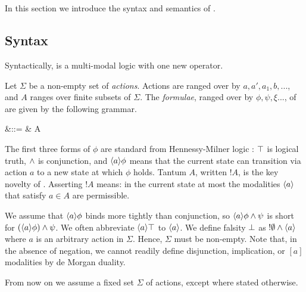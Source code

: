 \section{\Cathoristic{}}\label{coreEL}

In this section we introduce the syntax and semantics of \cathoristic{}.

\subsection{Syntax}
\label{elsyntax}
\NI Syntactically, \cathoristic{} is a multi-modal logic with one new
operator.

\begin{definition} Let $\Sigma$ be a non-empty set of \emph{actions}.
Actions are ranged over by $a, a', a_1, b, ...$, and $A$ ranges over
finite subsets of $\Sigma$. The \emph{formulae}, ranged over by $\phi,
\psi, \xi ...$, of \cathoristic{} are given by the
following grammar.

\begin{GRAMMAR}
  \phi 
     &\quad ::= \quad & 
  \TRUE 
     \VERTICAL 
  \phi \AND \psi
     \VERTICAL 
     \VERTICAL 
  \fBang A 
\end{GRAMMAR}
\end{definition}

\NI The first three forms of $\phi$ are standard from Hennessy-Milner
logic \cite{HennessyM:alglawfndac}: $\top$ is logical truth, $\land$
is conjunction, and $\langle a \rangle \phi$ means that the current state can
transition via action $a$ to a new state at which $\phi$ holds. Tantum
$A$, written $!A$, is the key novelty of \cathoristic{}.  Asserting
$!A$ means: in the current state at most the modalities $\langle a \rangle$
that satisfy $a \in A$ are permissible.

We assume that $\langle a \rangle \phi$ binds more tightly than conjunction, so
$\langle a \rangle \phi \land \psi$ is short for $(\langle a \rangle \phi) \land \psi$.
We often abbreviate $\langle a \rangle \top$ to $\langle a \rangle$. We define falsity
$\bot$ as $!\emptyset \land \langle a \rangle$ where $a$ is an arbitrary
action in $\Sigma$. 
Hence, $\Sigma$ must be
non-empty. 
Note that, in the absence of negation, we cannot
readily define disjunction, implication, or $[a]$ modalities by de
Morgan duality. 

\begin{convention}
From now on we assume a fixed set $\Sigma$ of actions, except where
stated otherwise.
\end{convention}

